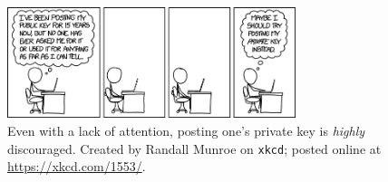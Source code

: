 \begin{figure}[t]
\centering
    \includegraphics[width=0.75\textwidth]{figures/xkcd/xkcd_1553_public_key.png}
    \caption[\texttt{xkcd} Public Key]{Even with a lack of attention,
        posting one's private key is \emph{highly} discouraged.
        Created by Randall Munroe on \texttt{xkcd};
        posted online at \url{https://xkcd.com/1553/}.
        }
    \label{fig:xkcd_public_key}
\end{figure}
